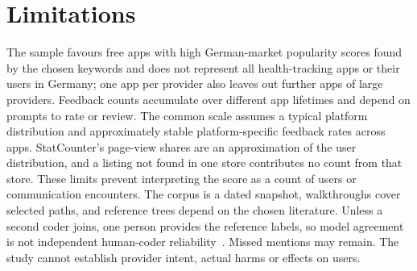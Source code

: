\section{Limitations} The sample favours free apps with high German-market
popularity scores found by the chosen keywords and does not represent all
health-tracking apps or their users in Germany; one app per provider also
leaves out further apps of large providers. Feedback counts accumulate over
different app lifetimes and depend on prompts to rate or review. The common
scale assumes a typical platform distribution and approximately stable
platform-specific feedback rates across apps. StatCounter's page-view shares
are an approximation of the user distribution, and a listing not found in one
store contributes no count from that store. These limits prevent interpreting
the score as a count of users or communication encounters. The corpus is a
dated snapshot, walkthroughs cover selected paths, and reference trees depend
on the chosen literature. Unless a second coder joins, one person provides the
reference labels, so model agreement is not independent human-coder
reliability~\parencite{mcdonald2019reliability}. Missed mentions may remain.
The study cannot establish provider intent, actual harms or effects on users.
